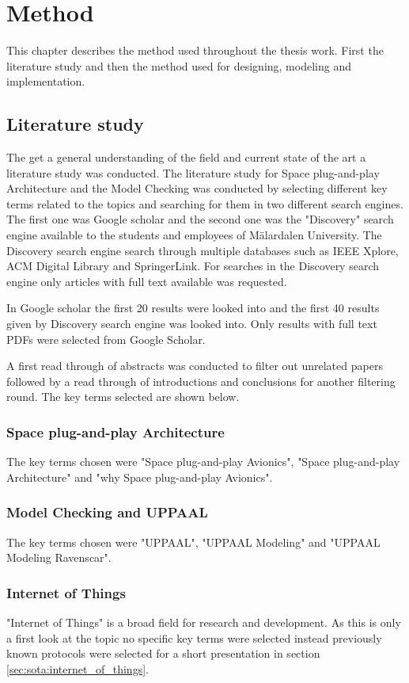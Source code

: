 \chapter{Method}\label{ch:method}
This chapter describes the method used throughout the thesis work. First
the literature study and then the method used for designing, modeling and
implementation.

\section{Literature study}
The get a general understanding of the field and current state of the art a
literature study was conducted. The literature study for Space plug-and-play
Architecture and the Model Checking was conducted by selecting different key
terms related to the topics and searching for them in two different search
engines. The first one was Google scholar and the second one was the
"Discovery" search engine available to the students and employees of
M\"{a}lardalen University. The Discovery search engine search through multiple
databases such as IEEE Xplore, ACM Digital Library and SpringerLink. For
searches in the Discovery search engine only articles with full text available
was requested.

In Google scholar the first 20 results were looked into and the first 40
results given by Discovery search engine was looked into. Only results with
full text PDFs were selected from Google Scholar.

A first read through of abstracts was conducted to filter out unrelated
papers followed by a read through of introductions and conclusions for
another filtering round. The key terms selected are shown below.

\subsection{Space plug-and-play Architecture}
The key terms chosen were "Space plug-and-play Avionics", "Space
plug-and-play Architecture" and "why Space plug-and-play Avionics".

\subsection{Model Checking and UPPAAL}
The key terms chosen were "UPPAAL", "UPPAAL Modeling" and "UPPAAL Modeling
Ravenscar".

\subsection{Internet of Things}
"Internet of Things" is a broad field for research and development. As this is
only a first look at the topic no specific key terms were selected instead
previously known protocols were selected for a short presentation in section
\ref{sec:sota:internet_of_things}.

